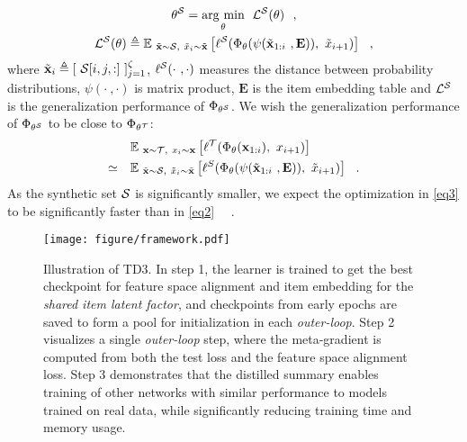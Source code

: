 \begin{equation} \label{eq3}
\begin{gathered}
    \theta^{\mathcal{S}} = \underset{\theta}{\operatorname{arg}\,\operatorname{min}}\;\  \mathcal{L}^{\mathcal{S}}(\theta) ~~, \\
    \mathcal{L}^{\mathcal{S}}(\theta) \triangleq \mathbb{E}_{~\Tilde{\mathbf{x}} \sim \mathcal{S},~ \Tilde{x}_i \sim \Tilde{\mathbf{x}}} \left[\ell^{\mathcal{S}}(\Phi_{\theta}(\psi(\Tilde{\mathbf{x}}_{1:i}~, \mathbf{E})),~ \Tilde{x}_{i+1})\right] ~~,
\end{gathered}
\end{equation}
where $\Tilde{\mathbf{x}}_i \triangleq [~ \mathcal{S}[i, j, :] ~]_{j=1}^{\zeta}$, $\ell^{\mathcal{S}}(\cdot~,\cdot)$ measures the distance between probability distributions, $\psi(\cdot~,\cdot)$ is matrix product, $\mathbf{E}$ is the item embedding table and $\mathcal{L}^{\mathcal{S}}$ is the generalization performance of $\Phi_{\theta^{\mathcal{S}}}$. 
We wish the generalization performance of $\Phi_{\theta^{\mathcal{S}}}$ to be close to $\Phi_{\theta^{\mathcal{T}}}$:
\begin{equation}
    \begin{aligned}
        & \mathbb{E}_{~\mathbf{x} \sim \mathcal{T},~ x_i \sim \mathbf{x}} \left[\ell^{\mathcal{T}}(\Phi_{\theta}(\mathbf{x}_{1:i}),~ x_{i+1})\right] \\ 
        \simeq \quad & \mathbb{E}_{~\Tilde{\mathbf{x}} \sim \mathcal{S},~ \Tilde{x}_i \sim \Tilde{\mathbf{x}}} \left[\ell^{S}(\Phi_{\theta}(\psi(\Tilde{\mathbf{x}}_{1:i}~, \mathbf{E})),~ \Tilde{x}_{i+1})\right] ~~.
    \end{aligned}
\end{equation}
As the synthetic set $\mathcal{S}$ is significantly smaller, we expect the optimization in \cref{eq3} to be significantly faster than in \cref{eq2} ~~. 



\begin{figure*}[t!] \centering
    \centering
    \texttt{[image: figure/framework.pdf]}
    \vspace{-0.6cm}
    \caption{Illustration of TD3. In step 1, the learner is trained to get the best checkpoint for feature space alignment and item embedding for the \emph{shared item latent factor}, and checkpoints from early epochs are saved to form a pool for initialization in each \emph{outer-loop}. Step 2 visualizes a single \emph{outer-loop} step, where the meta-gradient is computed from both the test loss and the feature space alignment loss. Step 3 demonstrates that the distilled summary enables training of other networks with similar performance to models trained on real data, while significantly reducing training time and memory usage.}
    \label{fig:framework}
    \vspace{-0.3cm}
\end{figure*}



